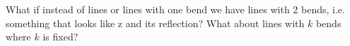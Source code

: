   What if instead of lines or lines with one bend we have
  lines with 2 bends, i.e. something that looks like z and its reflection?
 What about lines with $k$ bends where $k$ is fixed?
